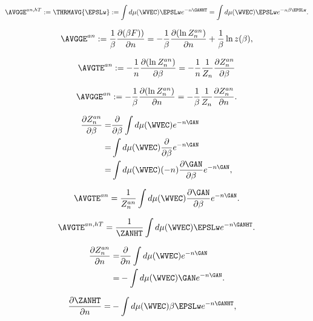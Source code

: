 \begin{align}
 \AVGGE^{an,hT}:=\THRMAVG{\EPSLw}:=\int d\mu(\WVEC)\EPSLw e^{-n\GANHT}=\int d\mu(\WVEC)\EPSLw e^{-n\beta\EPSLw}  .
\end{align}

\begin{align}
\label{eqn:avgge_def}
\AVGGE^{an}:=\frac{1}{\beta}\dfrac{\partial (\beta F))}{\partial n}= -\frac{1}{\beta}\dfrac{\partial (\ln Z^{an}_{n})}{\partial n}+\frac{1}{\beta}\ln z(\beta)  ,
\end{align}

\begin{align}
  \AVGTE^{an}
  := -\frac{1}{n}\dfrac{\partial (\ln Z^{an}_{n})}{\partial \beta}  =
 - \frac{1}{n}\frac{1}{Z_{n}}\dfrac{\partial Z^{an}_{n}}{\partial \beta} 
\end{align}

\begin{align}
  \label{eqn:avgge_def}
  \AVGGE^{an}
  := -\frac{1}{\beta}\dfrac{\partial (\ln Z^{an}_{n})}{\partial n}  =
  -\frac{1}{\beta}\frac{1}{Z_{n}}\dfrac{\partial Z^{an}_{n}}{\partial n}  .
\end{align}

\begin{align}
  \dfrac{\partial Z^{an}_{n}}{\partial \beta}
  = &  \dfrac{\partial }{\partial \beta} \int d\mu(\WVEC) e^{-n\GAN} \\ \nonumber
  = & \int d\mu(\WVEC) \dfrac{\partial }{\partial \beta} e^{-n\GAN}\\ \nonumber
  = & \int d\mu(\WVEC) (-n) \dfrac{\partial \GAN}{\partial \beta} e^{-n\GAN}  ,
\end{align}

\begin{align}
  \AVGTE^{an} = \frac{1}{Z^{an}_{n}}\int d\mu(\WVEC)  \dfrac{\partial \GAN}{\partial \beta} e^{-n\GAN} .
\end{align}

\begin{align}
  \label{eqn:avgte_anhT}
  \AVGTE^{an,hT} = \frac{1}{\ZANHT}\int d\mu(\WVEC) \EPSLw e^{-n\GANHT}  .
\end{align}

\begin{align}
  \dfrac{\partial Z^{an}_{n}}{\partial n}
  = &  \dfrac{\partial }{\partial n} \int d\mu(\WVEC) e^{-n\GAN} \\ \nonumber
  = & - \int d\mu(\WVEC) \GAN e^{-n\GAN}  .
\end{align}

\begin{align}
 \dfrac{\partial \ZANHT}{\partial n}
  = & - \int d\mu(\WVEC) \beta \EPSLw e^{-n\GANHT}  ,
\end{align}

